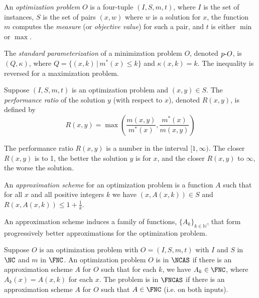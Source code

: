 \begin{definition}
  An \emph{optimization problem} $O$ is a four-tuple $(I, S, m, t)$, where $I$ is the set of instances, $S$ is the set of pairs $(x, w)$ where $w$ is a solution for $x$, the function $m$ computes the \emph{measure} (or \emph{objective value}) for such a pair, and $t$ is either $\min$ or $\max$.
\end{definition}

\begin{definition}\label{def:standard}
  The \emph{standard parameterization} of a minimization problem $O$, denoted $p\textnormal{-}{O}$, is $(Q, \kappa)$, where $Q = \{ (x, k) \, | \, m^*(x) \leq k \}$ and $\kappa(x, k) = k$.
  The inequality is reversed for a maximization problem.
\end{definition}

\begin{definition}
  Suppose $(I, S, m, t)$ is an optimization problem and $(x, y) \in S$.
  The \emph{performance ratio} of the solution $y$ (with respect to $x$), denoted $R(x, y)$, is defined by
  \[
  R(x, y) = \max \left(\frac{m(x, y)}{m^*(x)}, \frac{m^*(x)}{m(x, y)}\right)
  \]
\end{definition}

The performance ratio $R(x, y)$ is a number in the interval $[1, \infty)$.
The closer $R(x, y)$ is to 1, the better the solution $y$ is for $x$, and the closer $R(x, y)$ to $\infty$, the worse the solution.

\begin{definition}
  An \emph{approximation scheme} for an optimization problem is a function $A$ such that for all $x$ and all positive integers $k$ we have $(x, A(x, k)) \in S$ and $R(x, A(x, k)) \leq 1 + \frac{1}{k}$.
\end{definition}

An approximation scheme induces a family of functions, $\{A_k\}_{k \in \mathbb{N}}$, that form progressively better approximations for the optimization problem.


\begin{definition}
  Suppose $O$ is an optimization problem with $O = (I, S, m, t)$ with $I$ and $S$ in $\NC$ and $m$ in $\FNC$.
  An optimization problem $O$ is in $\NCAS$ if there is an approximation scheme $A$ for $O$ such that for each $k$, we have $A_k \in \FNC$, where $A_k(x) = A(x, k)$ for each $x$.
  The problem is in $\FNCAS$ if there is an approximation scheme $A$ for $O$ such that $A \in \FNC$ (i.e. on both inputs).
\end{definition}


